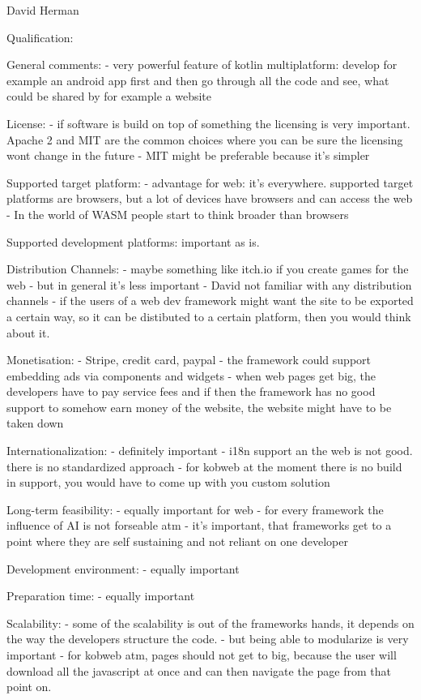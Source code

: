 David Herman

Qualification: 

General comments: 
- very powerful feature of kotlin multiplatform: develop for example an android app first and then go through all the code and see, what could be shared by for example a website

License:
- if software is build on top of something the licensing is very important. Apache 2 and MIT are the common choices where you can be sure the licensing wont change in the future
- MIT might be preferable because it's simpler

Supported target platform: 
- advantage for web: it's everywhere. supported target platforms are browsers, but a lot of devices have browsers and can access the web
- In the world of WASM people start to think broader than browsers

Supported development platforms: 
important as is. 

Distribution Channels: 
- maybe something like itch.io if you create games for the web
- but in general it's less important
- David not familiar with any distribution channels
- if the users of a web dev framework might want the site to be exported a certain way, so it can be distibuted to a certain platform, then you would think about it.

Monetisation: 
- Stripe, credit card, paypal
- the framework could support embedding ads via components and widgets
- when web pages get big, the developers have to pay service fees and if then the framework has no good support to somehow earn money of the website, the website might have to be taken down

Internationalization: 
- definitely important
- i18n support an the web is not good. there is no standardized approach
- for kobweb at the moment there is no build in support, you would have to come up with you custom solution

Long-term feasibility: 
- equally important for web
- for every framework the influence of AI is not forseable atm
- it's important, that frameworks get to a point where they are self sustaining and not reliant on one developer

Development environment: 
- equally important

Preparation time: 
- equally important

Scalability:
- some of the scalability is out of the frameworks hands, it depends on the way the developers structure the code. 
- but being able to modularize is very important
- for kobweb atm, pages should not get to big, because the user will download all the javascript at once and can then navigate the page from that point on.

